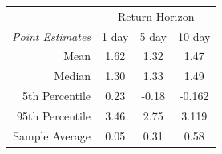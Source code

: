 \begin{tabular}{r | c c c}
\toprule 
& \multicolumn{3}{c}{Return Horizon} \\
\multicolumn{1}{l|}{\textit{Point Estimates}} & 1 day & 5 day & 10 day \\
\midrule 
Mean & 1.62 & 1.32 & 1.47 \\
Median & 1.30 & 1.33 & 1.49 \\
5th Percentile & 0.23 & -0.18 & -0.162 \\
95th Percentile & 3.46 & 2.75 & 3.119 \\
\midrule \midrule
Sample Average & 0.05 & 0.31 & 0.58 \\
\bottomrule
\end{tabular}